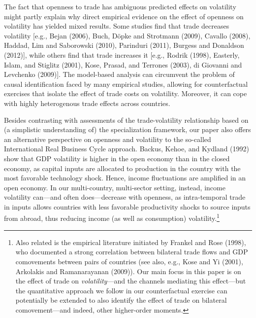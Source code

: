 \documentclass[12pt]{article}
\begin{document}
The fact that openness to trade has ambiguous predicted effects on
volatility might partly explain why direct empirical evidence on the effect
of openness on volatility has yielded mixed results. Some studies find that
trade decreases volatility [e.g., Bejan (2006), Buch, D\"{o}pke and
Strotmann (2009), Cavallo (2008), Haddad, Lim and Saborowski (2010),
Parinduri (2011), Burgess and Donaldson (2012)], while others find that
trade increases it [e.g., Rodrik (1998), Easterly, Islam, and Stiglitz
(2001), Kose, Prasad, and Terrones (2003), di Giovanni and Levchenko
(2009)]. The model-based analysis can circumvent the problem of causal
identification faced by many empirical studies, allowing for counterfactual
exercises that isolate the effect of trade costs on volatility. Moreover, it
can cope with highly heterogenous trade effects across countries.

Besides contrasting with assessments of the trade-volatility relationship
based on (a simplistic understanding of) the specialization framework, our
paper also offers an alternative perspective on openness and volatility to
the so-called International Real Business Cycle approach. Backus, Kehoe, and
Kydland (1992) show that GDP volatility is higher in the open economy than
in the closed economy, as capital inputs are allocated to production in the
country with the most favorable technology shock. Hence, income fluctuations
are amplified in an open economy. In our multi-country, multi-sector
setting, instead, income volatility can---and often does---decrease with
openness, as intra-temporal trade in inputs allows countries with less
favorable productivity shocks to source inputs from abroad, thus reducing
income (as well as consumption) volatility.\footnote{%
Also related is the empirical literature initiated by Frankel and Rose
(1998), who documented a strong correlation between bilateral trade flows
and GDP comovements between pairs of countries (see also, e.g., Kose and Yi
(2001), Arkolakis and Ramanarayanan (2009)). Our main focus in this paper is
on the effect of trade on \textit{volatility}---and the channels mediating
this effect---but the quantitative approach we follow in our counterfactual
exercise can potentially be extended to also identify the effect of trade on
bilateral comovement---and indeed, other higher-order moments.}
\end{document}
